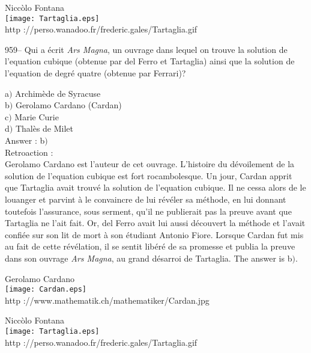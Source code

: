 ﻿\documentclass[letterpaper, 12pt]{article}
\begin{document}
        \begin{center}
        Nicc\`olo Fontana\\
    \texttt{[image: Tartaglia.eps]}\\
        {\footnotesize http
://perso.wanadoo.fr/frederic.gales/Tartaglia.gif}
    \end{center}

959-- Qui a \'ecrit {\sl Ars Magna}, un ouvrage dans lequel on
trouve la solution de l'equation cubique (obtenue par del Ferro et
Tartaglia) ainsi que la solution de l'equation de degr\'e quatre
(obtenue par Ferrari)?

a$)$ Archim\`ede de Syracuse  \\
b$)$ Gerolamo Cardano (Cardan)  \\
c$)$ Marie Curie  \\
d$)$ Thal\`es de Milet\\

Answer : b$)$\\

Retroaction : \\
Gerolamo Cardano est l'auteur de cet ouvrage. L'histoire du
d\'evoilement de la solution de l'equation cubique est fort
rocambolesque. Un jour, Cardan apprit que Tartaglia avait trouv\'e
la solution de l'equation cubique. Il ne cessa alors de le
louanger et parvint \`a le convaincre de lui r\'ev\'eler sa
m\'ethode, en lui donnant toutefois l'assurance, sous serment, qu'il
ne publierait pas la preuve avant que Tartaglia ne l'ait fait. Or,
del Ferro avait lui aussi d\'ecouvert la m\'ethode et l'avait
confi\'ee sur son lit de mort \`a son \'etudiant Antonio Fiore.
Lorsque Cardan fut mis au fait de cette r\'ev\'elation,
il se sentit lib\'er\'e de sa promesse et publia la preuve dans son ouvrage
{\sl Ars Magna}, au grand d\'esarroi de Tartaglia. The answer is b$)$.\\

        \begin{center}
        Gerolamo Cardano\\
    \texttt{[image: Cardan.eps]}\\
        {\footnotesize http ://www.mathematik.ch/mathematiker/Cardan.jpg}
    \end{center}

        \begin{center}
        Nicc\`olo Fontana\\
    \texttt{[image: Tartaglia.eps]}\\
        {\footnotesize http
://perso.wanadoo.fr/frederic.gales/Tartaglia.gif}
    \end{center}
\end{document}
